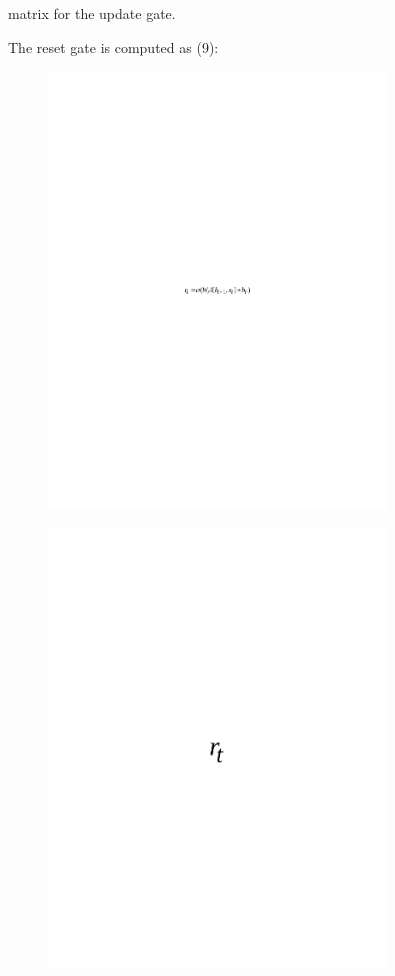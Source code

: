 matrix for the update gate.

The reset gate is computed as (9):

\begin{figure}[H]
	\centering
	\includegraphics[width=0.8\textwidth]{media/ict/image67}
	\caption*{}
\end{figure}


\begin{figure}[H]
	\centering
	\includegraphics[width=0.8\textwidth]{media/ict/image68}
	\caption*{}
\end{figure}

